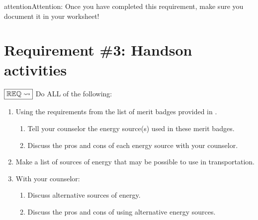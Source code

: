 \documentclass[letterpaper,10pt,english,openany,oneside]{sphinxmanual}
\begin{document}
\begin{sphinxadmonition}{attention}{Attention:}
Once you have completed this requirement, make sure you document it in your worksheet!
\end{sphinxadmonition}


\chapter{Requirement \#3: Hands\sphinxhyphen{}on activities}
\label{\detokenize{requirement3:requirement-3-hands-on-activities}}\label{\detokenize{requirement3::doc}}
\(\boxed{\mathbb{REQ}\Large \rightsquigarrow}\) Do ALL of the following:
\begin{enumerate}
%
\item {} 
Using the requirements from the list of merit badges provided in {\hyperref[\detokenize{requirement2:req2-mb}]{}}.
\begin{enumerate}
%
\item {} 
Tell your counselor the energy source(s) used in these merit badges.

\item {} 
Discuss the pros and cons of each energy source with your counselor.

\end{enumerate}

\item {} 
Make a list of sources of energy that may be possible to use in transportation.

\item {} 
With your counselor:
\begin{enumerate}
%
\item {} 
Discuss alternative sources of energy.

\item {} 
Discuss the pros and cons of using alternative energy sources.

\end{enumerate}

\end{enumerate}
\end{document}
